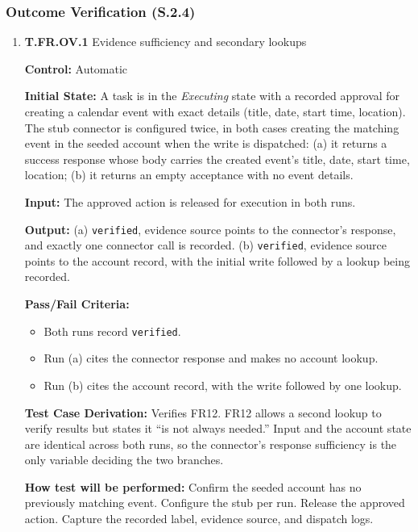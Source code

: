 \documentclass[12pt, titlepage]{article}
\begin{document}
\subsubsection{Outcome Verification (S.2.4)}
\begin{enumerate}

\item{\textbf{T.FR.OV.1} Evidence sufficiency and secondary lookups\\}\label{test:T.FR.OV.1}

\textbf{Control:} Automatic
					
\textbf{Initial State:} A task is in the \textit{Executing} state with a recorded approval for creating a calendar event with exact details 
(title, date, start time, location). The stub connector is configured twice, in both cases creating the matching event in the seeded account when
the write is dispatched: (a) it returns a success response whose body carries the created event's title, date,
start time, location; (b) it returns an empty acceptance with no event details.
					
\textbf{Input:} The approved action is released for execution in both runs.
					
\textbf{Output:} (a) \texttt{verified}, evidence source points to the connector's response, and exactly one connector call is recorded.
(b) \texttt{verified}, evidence source points to the account record, with the initial write followed by a lookup being recorded.

\textbf{Pass/Fail Criteria:}
\begin{itemize}
  \item Both runs record \texttt{verified}.
  \item Run (a) cites the connector response and makes no account lookup.
  \item Run (b) cites the account record, with the write followed by one lookup.
\end{itemize}

\textbf{Test Case Derivation:} Verifies FR12. FR12 allows a second lookup to verify results but states it ``is not always needed.'' Input and the account
state are identical across both runs, so the connector's response sufficiency is the only variable deciding the two branches.

\textbf{How test will be performed:} Confirm the seeded account has no previously matching event. Configure the stub per run. Release the approved action.
Capture the recorded label, evidence source, and dispatch logs.
					



\end{enumerate}
\end{document}
